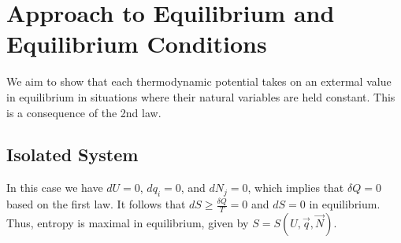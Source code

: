 \documentclass[12pt, a4paper, oneside, openright, titlepage]{book}
\begin{document}
\section{Approach to Equilibrium and Equilibrium Conditions}


We aim to show that each thermodynamic potential takes on an extermal value in equilibrium in situations where their natural variables are held constant. This is a consequence of the 2nd law.

\subsection{Isolated System}

In this case we have $dU = 0$, $dq_i = 0$, and $dN_j = 0$, which implies that $\delta Q = 0$ based on the first law. It follows that $dS \geq \frac{\delta Q}{T} = 0$ and $dS = 0$ in equilibrium. Thus, entropy is maximal in equilibrium, given by $S = S(U,\vec{q},\vec{N})$.
\end{document}
